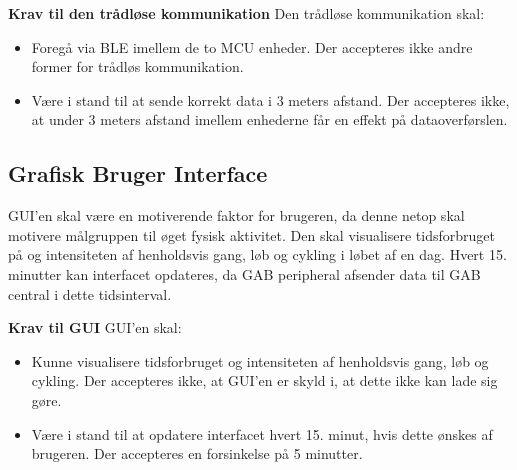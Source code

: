 \textbf{Krav til den trådløse kommunikation} \newline 
Den trådløse kommunikation skal:
\begin{itemize}
	\item Foregå via BLE imellem de to MCU enheder. Der accepteres ikke andre former for trådløs kommunikation.
	\item Være i stand til at sende korrekt data i 3 meters afstand. Der accepteres ikke, at under 3 meters afstand imellem enhederne får en effekt på dataoverførslen.
\end{itemize}

\subsection{Grafisk Bruger Interface}
GUI'en skal være en motiverende faktor for brugeren, da denne netop skal motivere målgruppen til øget fysisk aktivitet. Den skal visualisere tidsforbruget på og intensiteten af henholdsvis gang, løb og cykling i løbet af en dag. Hvert 15. minutter kan interfacet opdateres, da GAB peripheral afsender data til GAB central i dette tidsinterval.

\textbf{Krav til GUI} \newline 
GUI'en skal:
\begin{itemize}
	\item Kunne visualisere tidsforbruget og intensiteten af henholdsvis gang, løb og cykling. Der accepteres ikke, at GUI'en er skyld i, at dette ikke kan lade sig gøre.
	\item Være i stand til at opdatere interfacet hvert 15. minut, hvis dette ønskes af brugeren. Der accepteres en forsinkelse på 5 minutter.
\end{itemize}

